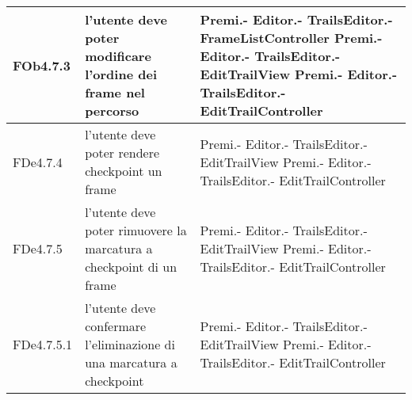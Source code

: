 \begin{longtable}{|l|p{5cm}|p{4cm}|}
\hline
FOb4.7.3 & l'utente deve poter modificare l'ordine dei frame nel percorso & Premi.- \linebreak Editor.- \linebreak TrailsEditor.- \linebreak FrameListController \linebreak Premi.- \linebreak Editor.- \linebreak TrailsEditor.- \linebreak EditTrailView \linebreak Premi.- \linebreak Editor.- \linebreak TrailsEditor.- \linebreak EditTrailController \linebreak \\
\hline
FDe4.7.4 & l'utente deve poter rendere checkpoint un frame & Premi.- \linebreak Editor.- \linebreak TrailsEditor.- \linebreak EditTrailView \linebreak Premi.- \linebreak Editor.- \linebreak TrailsEditor.- \linebreak EditTrailController \linebreak \\
\hline
FDe4.7.5 & l'utente deve poter rimuovere la marcatura a checkpoint di un frame & Premi.- \linebreak Editor.- \linebreak TrailsEditor.- \linebreak EditTrailView \linebreak Premi.- \linebreak Editor.- \linebreak TrailsEditor.- \linebreak EditTrailController \linebreak \\
\hline
FDe4.7.5.1 & l'utente deve confermare l'eliminazione di una marcatura a checkpoint & Premi.- \linebreak Editor.- \linebreak TrailsEditor.- \linebreak EditTrailView \linebreak Premi.- \linebreak Editor.- \linebreak TrailsEditor.- \linebreak EditTrailController \linebreak \\

\end{longtable}
